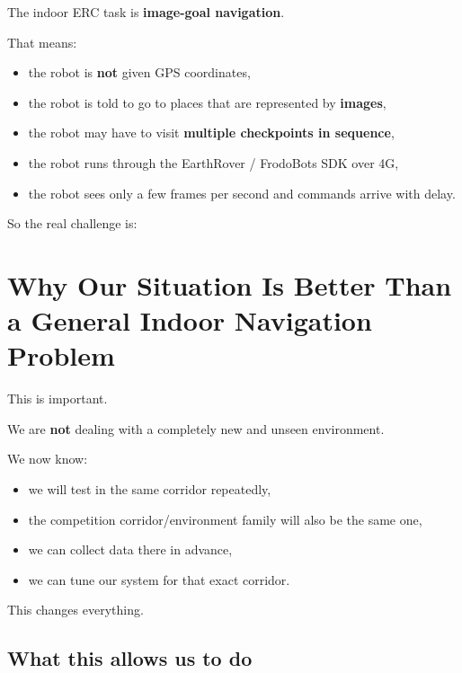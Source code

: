 \documentclass[11pt,a4paper]{article}
\begin{document}
The indoor ERC task is \textbf{image-goal navigation}.

That means:

\begin{itemize}[nosep]
  \item the robot is \textbf{not} given GPS coordinates,
  \item the robot is told to go to places that are represented by \textbf{images},
  \item the robot may have to visit \textbf{multiple checkpoints in sequence},
  \item the robot runs through the EarthRover / FrodoBots SDK over 4G,
  \item the robot sees only a few frames per second and commands arrive with delay.
\end{itemize}

So the real challenge is:

\begin{center}
\end{center}


\section{Why Our Situation Is Better Than a General Indoor Navigation Problem}

This is important.

We are \textbf{not} dealing with a completely new and unseen environment.

We now know:

\begin{itemize}[nosep]
  \item we will test in the same corridor repeatedly,
  \item the competition corridor/environment family will also be the same one,
  \item we can collect data there in advance,
  \item we can tune our system for that exact corridor.
\end{itemize}

This changes everything.

\subsection*{What this allows us to do}
\end{document}
